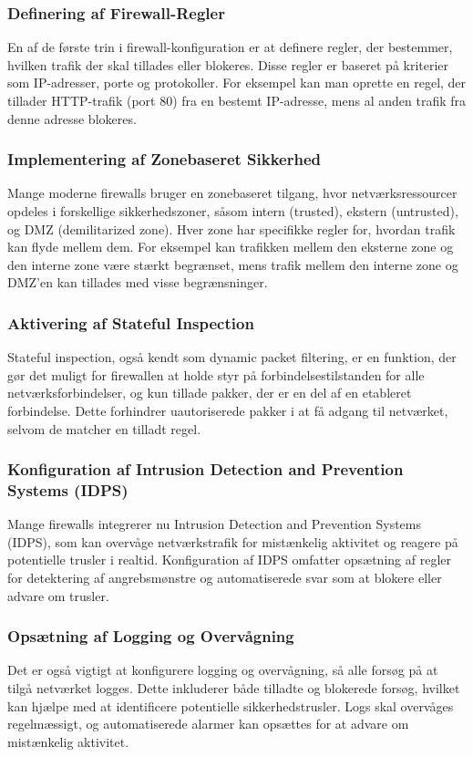 \subsubsection{Definering af Firewall-Regler}
En af de første trin i firewall-konfiguration er at definere regler, der bestemmer, hvilken trafik der skal tillades eller blokeres. Disse regler er baseret på kriterier som IP-adresser, porte og protokoller. For eksempel kan man oprette en regel, der tillader HTTP-trafik (port 80) fra en bestemt IP-adresse, mens al anden trafik fra denne adresse blokeres.

\subsubsection{Implementering af Zonebaseret Sikkerhed}
Mange moderne firewalls bruger en zonebaseret tilgang, hvor netværksressourcer opdeles i forskellige sikkerhedszoner, såsom intern (trusted), ekstern (untrusted), og DMZ (demilitarized zone). Hver zone har specifikke regler for, hvordan trafik kan flyde mellem dem. For eksempel kan trafikken mellem den eksterne zone og den interne zone være stærkt begrænset, mens trafik mellem den interne zone og DMZ'en kan tillades med visse begrænsninger.

\subsubsection{Aktivering af Stateful Inspection}
Stateful inspection, også kendt som dynamic packet filtering, er en funktion, der gør det muligt for firewallen at holde styr på forbindelsestilstanden for alle netværksforbindelser, og kun tillade pakker, der er en del af en etableret forbindelse. Dette forhindrer uautoriserede pakker i at få adgang til netværket, selvom de matcher en tilladt regel.

\subsubsection{Konfiguration af Intrusion Detection and Prevention Systems (IDPS)}
Mange firewalls integrerer nu Intrusion Detection and Prevention Systems (IDPS), som kan overvåge netværkstrafik for mistænkelig aktivitet og reagere på potentielle trusler i realtid. Konfiguration af IDPS omfatter opsætning af regler for detektering af angrebsmønstre og automatiserede svar som at blokere eller advare om trusler.

\subsubsection{Opsætning af Logging og Overvågning}
Det er også vigtigt at konfigurere logging og overvågning, så alle forsøg på at tilgå netværket logges. Dette inkluderer både tilladte og blokerede forsøg, hvilket kan hjælpe med at identificere potentielle sikkerhedstrusler. Logs skal overvåges regelmæssigt, og automatiserede alarmer kan opsættes for at advare om mistænkelig aktivitet.

